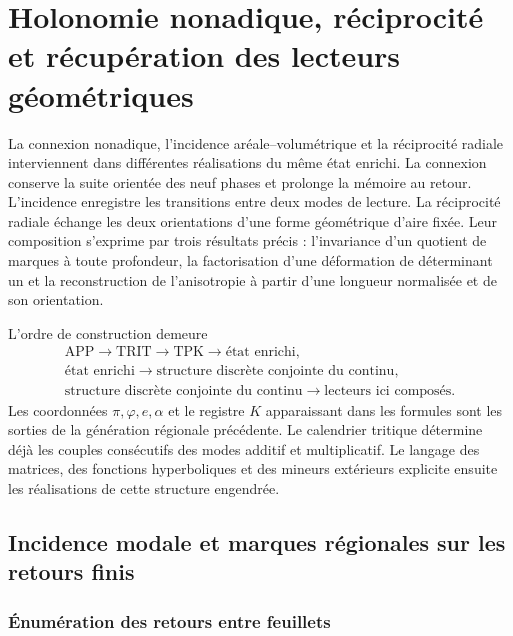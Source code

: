 \chapter{Holonomie nonadique, réciprocité et récupération des lecteurs géométriques}
\label{hrr:capitulo}

La connexion nonadique, l’incidence aréale--volumétrique et la réciprocité radiale interviennent dans différentes réalisations du même état enrichi. La connexion conserve la suite orientée des neuf phases et prolonge la mémoire au retour. L’incidence enregistre les transitions entre deux modes de lecture. La réciprocité radiale échange les deux orientations d’une forme géométrique d’aire fixée. Leur composition s’exprime par trois résultats précis : l’invariance d’un quotient de marques à toute profondeur, la factorisation d’une déformation de déterminant un et la reconstruction de l’anisotropie à partir d’une longueur normalisée et de son orientation.

L’ordre de construction demeure
\[
 \begin{gathered}
 \mathrm{APP}\longrightarrow\mathrm{TRIT}\longrightarrow\mathrm{TPK}
 \longrightarrow\text{état enrichi},\\
 \text{état enrichi}
 \longrightarrow\text{structure discrète conjointe du continu},\\
 \text{structure discrète conjointe du continu}
 \longrightarrow\text{lecteurs ici composés}.
 \end{gathered}
\]
Les coordonnées \(\pi,\varphi,e,\alpha\) et le registre \(K\) apparaissant dans les formules sont les sorties de la génération régionale précédente. Le calendrier tritique détermine déjà les couples consécutifs des modes additif et multiplicatif. Le langage des matrices, des fonctions hyperboliques et des mineurs extérieurs explicite ensuite les réalisations de cette structure engendrée.

\section{Incidence modale et marques régionales sur les retours finis}
\label{hrr:incidencia}

\subsection{Énumération des retours entre feuillets}

